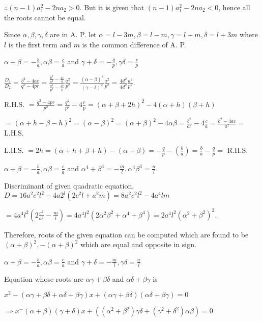   $\therefore (n - 1)a_1^2 - 2na_2 > 0$. But it is given that $(n - 1)a_1^2 - 2na_2 < 0$, hence all the
  roots cannot be equal.
\item Since $\alpha, \beta, \gamma, \delta$ are in A. P. let $\alpha = l - 3m, \beta = l - m, \gamma = l +
  m, \delta = l + 3m$ where $l$ is the first term and $m$ is the common difference of A. P.

  $\alpha + \beta = -\frac{b}{a}, \alpha\beta = \frac{c}{a}$ and $\gamma + \delta = -\frac{q}{p},
  \gamma\delta = \frac{r}{p}$

  $\frac{D_1}{D_2} = \frac{b^2 - 4ac}{q^2 - 4pr} = \frac{\frac{b^2}{a^2} - \frac{4c}{a}}{\frac{a^2}{p^2} -
    \frac{4r}{p}}\frac{a^2}{p^2}= \frac{(\alpha - \beta)^2}{(\gamma - \delta)^2}\frac{a^2}{p^2} =
  \frac{4d^2}{4d^2}\frac{a^2}{p^2}$.
\item R.H.S. $= \frac{q^2 - 4pr}{p^2} = \frac{q^2}{p^2} - 4\frac{r}{p} = (\alpha + \beta + 2h)^2 - 4(\alpha
  + h)(\beta + h)$

  $= (\alpha + h - \beta - h)^2 = (\alpha - \beta)^2 = (\alpha + \beta)^2 - 4\alpha\beta = \frac{b^2}{a^2} -
  4\frac{c}{a} = \frac{b^2 - 4ac}{a^2} =$ L.H.S.
\item L.H.S. $= 2h = (\alpha + h + \beta + h) - (\alpha + \beta) = -\frac{q}{p} -(\frac{b}{a}) = \frac{b}{a}
  - \frac{q}{p} =$ R.H.S.
\item $\alpha + \beta = -\frac{b}{a}, \alpha\beta = \frac{c}{a}$ and $\alpha^4 + \beta^4 = -\frac{m}{l},
  \alpha^4\beta^4 = \frac{n}{l}$.

  Discriminant of given quadratic equation, $D = 16a^2c^2l^2 - 4a2^l(2c^2l + a^2m) = 8a^2c^2l^2 - 4a^4lm$

  $= 4a^4l^2\left(2\frac{c^2}{a^2} - \frac{m}{l}\right)= 4a^4l^2(2\alpha^2\beta^2 + \alpha^4 + \beta^4) =
  2a^4l^2(\alpha^2 + \beta^2)^2$.

  Therefore, roots of the given equation can be computed which are found to be $(\alpha + \beta)^2, -(\alpha
  + \beta)^2$ which are equal and opposite in sign.
\item $\alpha + \beta = -\frac{b}{a}, \alpha\beta = \frac{c}{a}$ and $\gamma + \delta = -\frac{m}{l},
  \gamma\delta = \frac{n}{l}$

  Equation whose roots are $\alpha\gamma + \beta\delta$ and $\alpha\delta + \beta\gamma$ is

  $x^2 - (\alpha\gamma + \beta\delta + \alpha\delta + \beta\gamma)x + (\alpha\gamma +
  \beta\delta)(\alpha\delta + \beta\gamma) = 0$

  $\Rightarrow x^ - (\alpha + \beta)(\gamma + \delta)x + ((\alpha^2 + \beta^2)\gamma\delta + (\gamma^2 +
  \delta^2)\alpha\beta) = 0$

